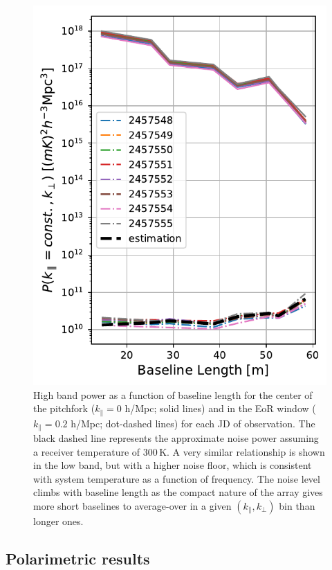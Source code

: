 \documentclass[twocolumn, trackchanges]{aastex61}
\begin{document}
\begin{figure}
\centering
\includegraphics[scale=0.5]{noise_estimation.pdf}
\caption{High band power as a function of baseline length for the center of the pitchfork ($k_{\parallel}=0$ h/Mpc; solid lines) and in the EoR window ($k_{\parallel}=0.2$ h/Mpc; dot-dashed lines) for  each JD of observation. The black dashed line represents the approximate noise power assuming a receiver temperature of 300\,K. A very similar relationship is shown in the low band, but with a higher noise floor, which is consistent with system temperature as a function of frequency. The noise level climbs with baseline length as the compact nature of the array gives more short baselines to average-over in a given $(k_{\parallel},k_{\perp})$ bin than longer ones.}
\label{fig:highband_cuts_per_day}
\end{figure}

\subsection{Polarimetric results}
\label{subsec:polarimetric_results}
\end{document}
